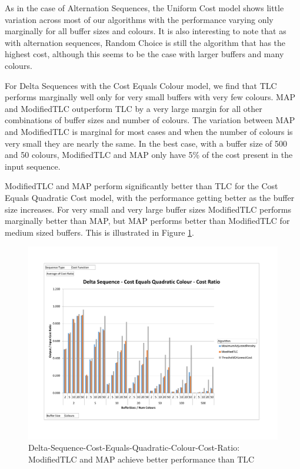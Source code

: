 As in the case of Alternation Sequences, the Uniform Cost model shows little variation across most of our algorithms with the performance varying only marginally for all buffer sizes and colours. It is also interesting to note that as with alternation sequences, Random Choice is still the algorithm that has the highest cost, although this seems to be the case with larger buffers and many colours. 

For Delta Sequences with the Cost Equals Colour model, we find that TLC performs marginally well only for very small buffers with very few colours. MAP and ModifiedTLC outperform TLC by a very large margin for all other combinations of buffer sizes and number of colours. The variation between MAP and ModifiedTLC is marginal for most cases and when the number of colours is very small they are nearly the same. In the best case, with a buffer size of 500 and 50 colours, ModifiedTLC and MAP only have 5\% of the cost present in the input sequence.

ModifiedTLC and MAP perform significantly better than TLC for the Cost Equals Quadratic Cost model, with the performance getting better as the buffer size increases. For very small and very large buffer sizes ModifiedTLC performs marginally better than MAP, but MAP performs better than ModifiedTLC for medium sized buffers. This is illustrated in Figure \ref{DeltaSeqCostEqualsQuadraticColour}. 

\begin{figure}[ht]
\centering 
\includegraphics[scale=0.60]{Delta-Seq-Cost-Equals-Quadratic-Colour.pdf}
\caption{Delta-Sequence-Cost-Equals-Quadratic-Colour-Cost-Ratio: ModifiedTLC and MAP achieve better performance than TLC}
\label{DeltaSeqCostEqualsQuadraticColour}
\end{figure}

